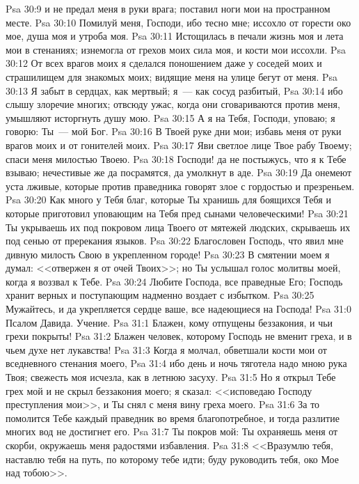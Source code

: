 \vs Psa 30:9 и не предал меня в руки врага; поставил ноги мои на пространном месте.
\vs Psa 30:10 Помилуй меня, Господи, ибо тесно мне; иссохло от горести око мое, душа моя и утроба моя.
\vs Psa 30:11 Истощилась в печали жизнь моя и лета мои в стенаниях; изнемогла от грехов моих сила моя, и кости мои иссохли.
\vs Psa 30:12 От всех врагов моих я сделался поношением даже у соседей моих и страшилищем для знакомых моих; видящие меня на улице бегут от меня.
\vs Psa 30:13 Я забыт в сердцах, как мертвый; я~--- как сосуд разбитый,
\vs Psa 30:14 ибо слышу злоречие многих; отвсюду ужас, когда они сговариваются против меня, умышляют исторгнуть душу мою.
\vs Psa 30:15 А я на Тебя, Господи, уповаю; я говорю: Ты~--- мой Бог.
\vs Psa 30:16 В Твоей руке дни мои; избавь меня от руки врагов моих и от гонителей моих.
\vs Psa 30:17 Яви светлое лице Твое рабу Твоему; спаси меня милостью Твоею.
\vs Psa 30:18 Господи! да не постыжусь, что я к Тебе взываю; нечестивые же да посрамятся, да умолкнут в аде.
\vs Psa 30:19 Да онемеют уста лживые, которые против праведника говорят злое с гордостью и презреньем.
\vs Psa 30:20 Как много у Тебя благ, которые Ты хранишь для боящихся Тебя и которые приготовил уповающим на Тебя пред сынами человеческими!
\vs Psa 30:21 Ты укрываешь их под покровом лица Твоего от мятежей людских, скрываешь их под сенью от пререкания языков.
\vs Psa 30:22 Благословен Господь, что явил мне дивную милость Свою в укрепленном городе!
\vs Psa 30:23 В смятении моем я думал: <<отвержен я от очей Твоих>>; но Ты услышал голос молитвы моей, когда я воззвал к Тебе.
\vs Psa 30:24 Любите Господа, все праведные Его; Господь хранит верных и поступающим надменно воздает с избытком.
\vs Psa 30:25 Мужайтесь, и да укрепляется сердце ваше, все надеющиеся на Господа!
\vs Psa 31:0 Псалом Давида. Учение.
\rsbpar\vs Psa 31:1 Блажен, кому отпущены беззакония, и чьи грехи покрыты!
\vs Psa 31:2 Блажен человек, которому Господь не вменит греха, и в чьем духе нет лукавства!
\vs Psa 31:3 Когда я молчал, обветшали кости мои от вседневного стенания моего,
\vs Psa 31:4 ибо день и ночь тяготела надо мною рука Твоя; свежесть моя исчезла, как в летнюю засуху.
\vs Psa 31:5 Но я открыл Тебе грех мой и не скрыл беззакония моего; я сказал: <<исповедаю Господу преступления мои>>, и Ты снял с меня вину греха моего.
\vs Psa 31:6 За то помолится Тебе каждый праведник во время благопотребное, и тогда разлитие многих вод не достигнет его.
\vs Psa 31:7 Ты покров мой: Ты охраняешь меня от скорби, окружаешь меня радостями избавления.
\vs Psa 31:8 <<Вразумлю тебя, наставлю тебя на путь, по которому тебе идти; буду руководить тебя, око Мое над тобою>>.
